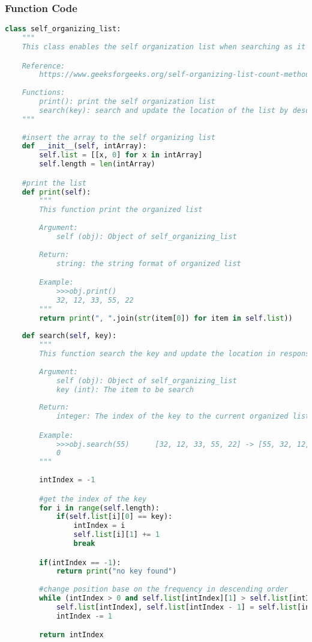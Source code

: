 \documentclass{article}
\begin{document}
\subsubsection*{Function Code}
\begin{lstlisting}[language=Python]
class self_organizing_list:
    """
    This class enables the self organization list when searching as it position the most frequent search infront of the array to improve the performance of sequential search

    Reference:
        https://www.geeksforgeeks.org/self-organizing-list-count-method/
        
    Functions:
        print(): print the self organization list
        search(key): search and update the location of the list by descending order of frequency in each item
    """
    
    #insert the array to the self organizing list
    def __init__(self, intArray):
        self.list = [[x, 0] for x in intArray]
        self.length = len(intArray)

    #print the list
    def print(self):
        """
        This function print the organized list
        
        Argument:
            self (obj): Object of self_organizing_list
        
        Return:
            string: the string format of organized list

        Example:
            >>>obj.print()
            32, 12, 33, 55, 22
        """
        return print(", ".join(str(item[0]) for item in self.list))
    
    def search(self, key):
        """
        This function search the key and update the location in response to its frequency
        
        Argument:
            self (obj): Object of self_organizing_list
            key (int): The item to be search
        
        Return:
            integer: The index of the key to the current organized list

        Example:
            >>>obj.search(55)      [32, 12, 33, 55, 22] -> [55, 32, 12, 33, 22]
            0
        """
        
        intIndex = -1

        #get the index of the key
        for i in range(self.length):
            if(self.list[i][0] == key):
                intIndex = i
                self.list[i][1] += 1
                break

        if(intIndex == -1):
            return print("no key found")
        
        #change position base on the frequency in descending order
        while (intIndex > 0 and self.list[intIndex][1] > self.list[intIndex - 1][1]):
            self.list[intIndex], self.list[intIndex - 1] = self.list[intIndex - 1], self.list[intIndex]
            intIndex -= 1

        return intIndex
\end{lstlisting}
\end{document}
